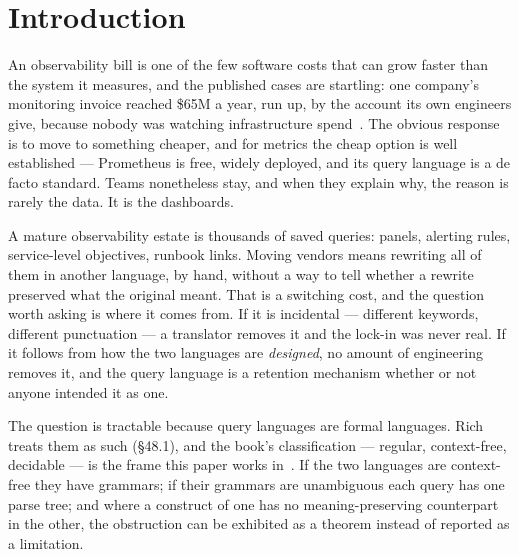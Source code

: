 
\section{Introduction}
\label{s2:sec:intro}

An observability bill is one of the few software costs that can grow faster than the
system it measures, and the published cases are startling: one company's monitoring
invoice reached \$65M a year, run up, by the account its own engineers give, because
nobody was watching infrastructure spend~\citep{orosz2023}. The obvious response is to
move to something cheaper, and for metrics the cheap option is well established ---
Prometheus is free, widely deployed, and its query language is a de facto standard. Teams
nonetheless stay, and when they explain why, the reason is rarely the data. It is the
dashboards.

A mature observability estate is thousands of saved queries: panels, alerting rules,
service-level objectives, runbook links. Moving vendors means rewriting all of them in
another language, by hand, without a way to tell whether a rewrite preserved what the
original meant. That is a switching cost, and the question worth asking is where it comes
from. If it is incidental --- different keywords, different punctuation --- a translator
removes it and the lock-in was never real. If it follows from how the two languages are
\emph{designed}, no amount of engineering removes it, and the query language is a retention
mechanism whether or not anyone intended it as one.

The question is tractable because query languages are formal languages. Rich treats them
as such (§48.1), and the book's classification --- regular, context-free, decidable --- is
the frame this paper works in~\citep{rich2008}. If the two languages are context-free they
have grammars; if their grammars are unambiguous each query has one parse tree; and where a
construct of one has no meaning-preserving counterpart in the other, the obstruction can be
exhibited as a theorem instead of reported as a limitation.


